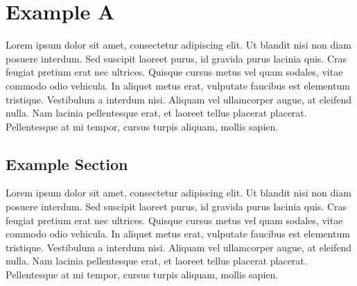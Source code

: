
\chapter{Example A}

Lorem ipsum dolor sit amet, consectetur adipiscing elit. Ut blandit nisi non diam posuere interdum. Sed suscipit laoreet purus, id gravida purus lacinia quis. Cras feugiat pretium erat nec ultrices. Quisque cursus metus vel quam sodales, vitae commodo odio vehicula. In aliquet metus erat, vulputate faucibus est elementum tristique. Vestibulum a interdum nisi. Aliquam vel ullamcorper augue, at eleifend nulla. Nam lacinia pellentesque erat, et laoreet tellus placerat placerat. Pellentesque at mi tempor, cursus turpis aliquam, mollis sapien.

\section {Example Section}
Lorem ipsum dolor sit amet, consectetur adipiscing elit. Ut blandit nisi non diam posuere interdum. Sed suscipit laoreet purus, id gravida purus lacinia quis. Cras feugiat pretium erat nec ultrices. Quisque cursus metus vel quam sodales, vitae commodo odio vehicula. In aliquet metus erat, vulputate faucibus est elementum tristique. Vestibulum a interdum nisi. Aliquam vel ullamcorper augue, at eleifend nulla. Nam lacinia pellentesque erat, et laoreet tellus placerat placerat. Pellentesque at mi tempor, cursus turpis aliquam, mollis sapien.
